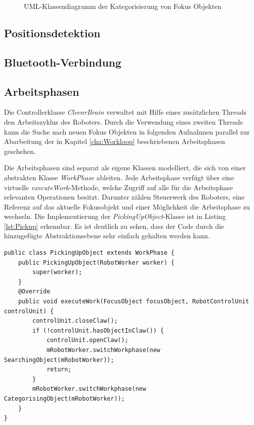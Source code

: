 \begin{figure}[h]
\centering
\caption{UML-Klassendiagramm der Kategorisierung von Fokus Objekten}
\label{fig:UMLCategorisation}
\end{figure}

\subsection{Positionsdetektion}

\subsection{Bluetooth-Verbindung}

\subsection{Arbeitsphasen}

Die Controllerklasse \textit{CleenrBrain} verwaltet mit Hilfe eines zusätzlichen Threads den Arbeitszyklus des Roboters. Durch die Verwendung eines zweiten Threads kann die Suche nach neuen Fokus Objekten in folgenden Aufnahmen parallel zur Abarbeitung der in Kapitel \ref{cha:Workloop} beschriebenen Arbeitsphasen geschehen. 

Die Arbeitsphasen sind separat als eigene Klassen modelliert, die sich von einer abstrakten Klasse \textit{WorkPhase} ableiten. Jede Arbeitsphase verfügt über eine virtuelle \textit{executeWork}-Methode, welche Zugriff auf alle für die Arbeitsphase relevanten Operationen besitzt. Darunter zählen Steuerwerk des Roboters, eine Referenz auf das aktuelle Fokusobjekt und einer Möglichkeit die Arbeitsphase zu wechseln. Die Implementierung der \textit{PickingUpObject}-Klasse ist in Listing \ref{lst:Pickup} erkennbar. Es ist deutlich zu sehen, dass der Code durch die hinzugefügte Abstraktionsebene sehr einfach gehalten werden kann.

\begin{lstlisting}[caption={Implementierung der Arbeitsphase \glqq Gegenstand aufnehmen\grqq }, label=lst:Pickup]
public class PickingUpObject extends WorkPhase {
    public PickingUpObject(RobotWorker worker) {
        super(worker);
    }
    @Override
    public void executeWork(FocusObject focusObject, RobotControlUnit controlUnit) {
        controlUnit.closeClaw();
        if (!controlUnit.hasObjectInClaw()) {
            controlUnit.openClaw();
            mRobotWorker.switchWorkphase(new SearchingObject(mRobotWorker));
            return;
        }
        mRobotWorker.switchWorkphase(new CategorisingObject(mRobotWorker));
    }
}
\end{lstlisting}

